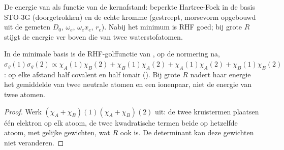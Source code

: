 \begin{omfigure}

{\small De energie van  als functie van de kernafstand: beperkte
Hartree-Fock in de basis STO-3G (doorgetrokken) en de echte kromme
(gestreept, morsevorm opgebouwd uit de gemeten $D_0$, $\omega_e$, $\omega_ex_e$, $r_e$). Nabij het
minimum is RHF goed; bij grote $R$ stijgt de energie ver boven die van
twee waterstofatomen.}
\end{omfigure}

\begin{proposition}\label{prop:b3:computational-chemistry:rhf-dissociation}
In de minimale basis is de RHF-golffunctie van , op de normering na,
$\sigma_g(1)\sigma_g(2) \propto \chi_A(1)\chi_B(2) + \chi_B(1)\chi_A(2)
+ \chi_A(1)\chi_A(2) + \chi_B(1)\chi_B(2)$: op elke afstand half covalent en half
ionair (). Bij grote $R$ nadert haar energie het gemiddelde van
twee neutrale atomen en een ionenpaar, niet de energie van twee atomen.
\end{proposition}

\begin{proof}
Werk $(\chi_A + \chi_B)(1)(\chi_A + \chi_B)(2)$ uit: de twee kruistermen
plaatsen één elektron op elk atoom, de twee kwadratische termen beide op
hetzelfde atoom, met gelijke gewichten, wat $R$ ook is. De determinant kan
deze gewichten niet veranderen.
\end{proof}

